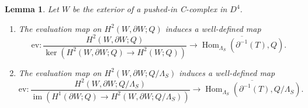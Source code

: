 \documentclass[11pt,a4paper]{amsart}
\newtheorem{lemma}[theorem]{Lemma}
\theoremstyle{definition}
\newcommand{\im}{\operatorname{im}}
\DeclareMathOperator{\Hom}{Hom}
\begin{document}
\begin{lemma}
\label{lem:EvBienDef}
Let $W$ be the exterior of a pushed-in C-complex in $D^4$.
\begin{enumerate}
\item The evaluation map on $H^2(W,\partial W;Q)$ induces a well-defined map 
$$\text{ev} \colon \frac{H^2(W,\partial W;Q)}{\ker(H^2(W,\partial W;Q) \to H^2(W;Q)) } \to  \overline{ \Hom_{\Lambda_S}(\partial^{-1}(T),Q) }.$$
\item The evaluation map on $H^2(W,\partial W;Q/ \Lambda_S)$ induces a well-defined map 
 $$\text{ev} \colon \frac{H^2(W,\partial W;Q/\Lambda_S)}{\im(H^1(\partial W;Q) \to H^2(W,\partial W;Q/\Lambda_S))} \to   \overline{ \Hom_{\Lambda_S}(\partial^{-1}(T),Q/\Lambda_S) }.$$
\end{enumerate}
\end{lemma}
\end{document}
